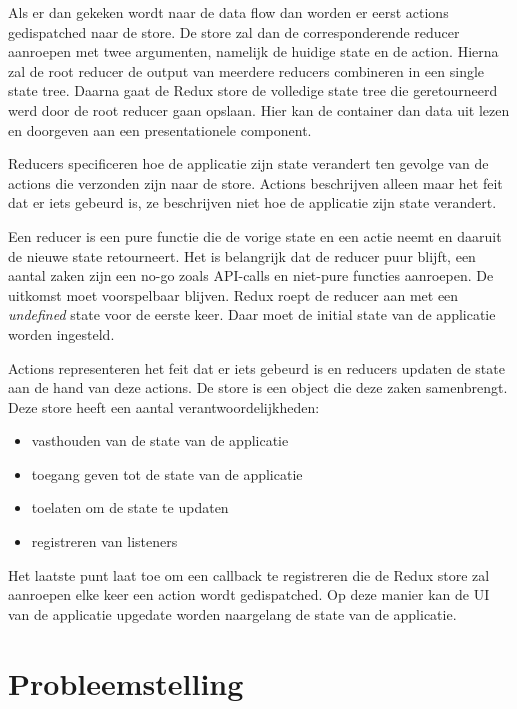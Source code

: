 Als er dan gekeken wordt naar de data flow dan worden er eerst actions gedispatched naar de store. De store zal dan de corresponderende reducer aanroepen met twee argumenten, namelijk de huidige state en de action. Hierna zal de root reducer de output van meerdere reducers combineren in een single state tree. Daarna gaat de Redux store de volledige state tree die geretourneerd werd door de root reducer gaan opslaan. Hier kan de container dan data uit lezen en doorgeven aan een presentationele component.

Reducers specificeren hoe de applicatie zijn state verandert ten gevolge van de actions die verzonden zijn naar de store. Actions beschrijven alleen maar het feit dat er iets gebeurd is, ze beschrijven niet hoe de applicatie zijn state verandert.

Een reducer is een pure functie die de vorige state en een actie neemt en daaruit de nieuwe state retourneert. Het is belangrijk dat de reducer puur blijft, een aantal zaken zijn een no-go zoals API-calls en niet-pure functies aanroepen. De uitkomst moet voorspelbaar blijven. Redux roept de reducer aan met een \textit{undefined} state voor de eerste keer. Daar moet de initial state van de applicatie worden ingesteld. \autocite{Redux02}

Actions representeren het feit dat er iets gebeurd is en reducers updaten de state aan de hand van deze actions. De store is een object die deze zaken samenbrengt. Deze store heeft een aantal verantwoordelijkheden: 
\begin{itemize}
	\item vasthouden van de state van de applicatie
	\item toegang geven tot de state van de applicatie
	\item toelaten om de state te updaten
	\item registreren van listeners
\end{itemize}
Het laatste punt laat toe om een callback te registreren die de Redux store zal aanroepen elke keer een action wordt gedispatched. Op deze manier kan de UI van de applicatie upgedate worden naargelang de state van de applicatie. 



\section{Probleemstelling}
\label{sec:probleemstelling}


